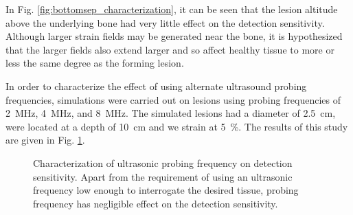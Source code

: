 			In Fig. \ref{fig:bottomsep_characterization}, it can be seen that the lesion altitude above the underlying bone had very little effect on the detection sensitivity. Although larger strain fields may be generated near the bone, it is hypothesized that the larger fields also extend larger and so affect healthy tissue to more or less the same degree as the forming lesion.

			In order to characterize the effect of using alternate ultrasound probing frequencies, simulations were carried out on lesions using probing frequencies of \SI{2}{\MHz}, \SI{4}{\MHz}, and \SI{8}{\MHz}. The simulated lesions had a diameter of \SI{2.5}{\cm}, were located at a depth of \SI{10}{\cm} and we strain at \SI{5}{\percent}. The results of this study are given in Fig. \ref{fig:freq_characterization}.

			\begin{figure}[!t]
				\centering
				\caption[Quasi-static ultrasound probing frequency characterization]{Characterization of ultrasonic probing frequency on detection sensitivity. Apart from the requirement of using an ultrasonic frequency low enough to interrogate the desired tissue, probing frequency has negligible effect on the detection sensitivity.}
				\label{fig:freq_characterization}
			\end{figure}

